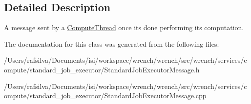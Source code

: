 \subsection{Detailed Description}
A message sent by a \hyperlink{classwrench_1_1_compute_thread}{Compute\+Thread} once it\textquotesingle{}s done performing its computation. 

The documentation for this class was generated from the following files\+:\begin{DoxyCompactItemize}
\item 
/\+Users/rafsilva/\+Documents/isi/workspace/wrench/wrench/src/wrench/services/compute/standard\+\_\+job\+\_\+executor/Standard\+Job\+Executor\+Message.\+h\item 
/\+Users/rafsilva/\+Documents/isi/workspace/wrench/wrench/src/wrench/services/compute/standard\+\_\+job\+\_\+executor/Standard\+Job\+Executor\+Message.\+cpp\end{DoxyCompactItemize}
